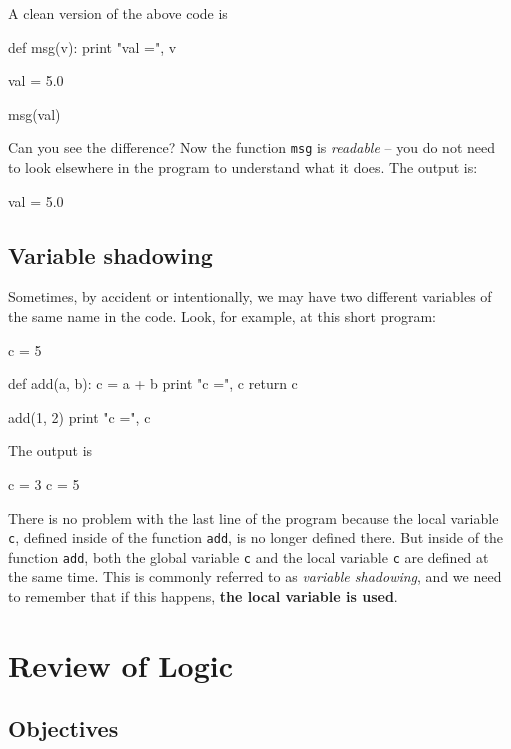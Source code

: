 \noindent
A clean version of the above code is

\begin{bluecode}
def msg(v):
    print "val =", v

val = 5.0

msg(val)
\end{bluecode}
Can you see the difference? Now the function {\tt msg} is {\em readable} -- you do not 
need to look elsewhere in the program to understand what it does. The output is:

\begin{greencode}
val = 5.0
\end{greencode}

\subsection{Variable shadowing}

Sometimes, by accident or intentionally, we may have two different 
variables of the same name in the code. Look, for example, at this short program:

\begin{bluecode}
c = 5

def add(a, b):
    c = a + b
    print "c =", c
    return c

add(1, 2)
print "c =", c
\end{bluecode}
The output is

\begin{greencode}
c = 3
c = 5
\end{greencode}
There is no 
problem with the last line of the program because the local variable {\tt c}, defined
inside of the function {\tt add}, is no longer defined there. But inside of the function
{\tt add}, both the global variable {\tt c} and the local variable {\tt c} are defined at 
the same time. This is commonly referred to as {\em variable shadowing}, and we need to 
remember that if this happens, {\bf the local variable is used}.


\section{Review of Logic}

\subsection{Objectives}

